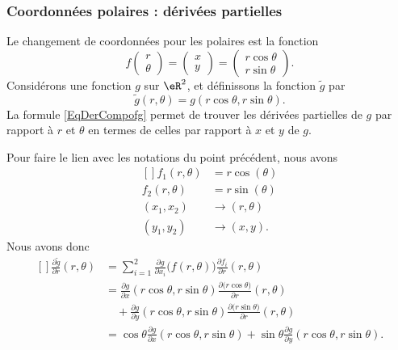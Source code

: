 \subsubsection{Coordonnées polaires : dérivées partielles}

Le changement de coordonnées pour les polaires est la fonction
\begin{equation}
    f\begin{pmatrix}
        r    \\
        \theta
    \end{pmatrix}=\begin{pmatrix}
        x    \\
        y
    \end{pmatrix}=\begin{pmatrix}
        r\cos\theta    \\
        r\sin\theta
    \end{pmatrix}.
\end{equation}
Considérons une fonction $g$ sur $\eR^2$, et définissons la fonction $\tilde g$ par
\begin{equation}
    \tilde g(r,\theta)=g(r\cos\theta,r\sin\theta).
\end{equation}
La formule \eqref{EqDerCompofg} permet de trouver les dérivées partielles de $g$ par rapport à $r$ et $\theta$ en termes de celles par rapport à $x$ et $y$ de $g$.

Pour faire le lien avec les notations du point précédent, nous avons
\begin{equation}
    \begin{aligned}[]
        f_1(r,\theta)&=r\cos(\theta)\\
        f_2(r,\theta)&=r\sin(\theta)\\
        (x_1,x_2)&\to(r,\theta)\\
        (y_1,y_2)&\to(x,y).
    \end{aligned}
\end{equation}
Nous avons donc
\begin{equation}
    \begin{aligned}[]
        \frac{ \partial \tilde g }{ \partial r }(r,\theta)&=\sum_{i=1}^2\frac{ \partial g }{ \partial x_i }\big( f(r,\theta) \big)\frac{ \partial f_i }{ \partial r }(r,\theta)\\
        &=\frac{ \partial g }{ \partial x }(r\cos\theta,r\sin\theta)\frac{ \partial \big( r\cos\theta \big) }{ \partial r }(r,\theta)\\
        &\quad+\frac{ \partial g }{ \partial y }(r\cos\theta,r\sin\theta)\frac{ \partial \big( r\sin\theta\big) }{ \partial r }(r,\theta)\\
        &=\cos\theta\frac{ \partial g }{ \partial x }(r\cos\theta,r\sin\theta)+\sin\theta\frac{ \partial g }{ \partial y }(r\cos\theta,r\sin\theta).
    \end{aligned}
\end{equation}

